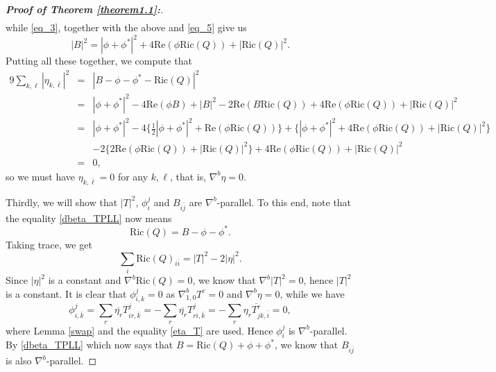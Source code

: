 \documentclass{amsart}
\numberwithin{equation}{section}
\theoremstyle{definition}
\renewcommand{\1}{\mathds{1}}
\renewcommand{\>}{\rightarrow}
\begin{document}
\begin{proof}[{\bf Proof of Theorem \ref{theorem1.1}:}]
\begin{eqnarray*}
\end{eqnarray*}
while \eqref{eq_3}, together with the above and \eqref{eq_5} give us
\[|B|^2 = |\phi + \phi^*|^2 + 4\mathrm{Re}(\phi \mathrm{Ric}(Q)) + |\mathrm{Ric}(Q)|^2.\]
Putting all these together, we compute that
\begin{eqnarray*}
9\sum_{k,\ell}|\eta_{k,\bar{\ell}}|^2   & = & |B-\phi -\phi^{\ast} - \mathrm{Ric}(Q)|^2 \\
& = & |\phi +\phi^{\ast}|^2 -4 \mathrm{Re}(\phi B) + |B|^2 -2 \mathrm{Re}(B\mathrm{Ric}(Q))  +4\mathrm{Re}(\phi \mathrm{Ric}(Q))  + |\mathrm{Ric}(Q)|^2\\
& = & |\phi +\phi^{\ast}|^2 -4 \{ \frac{1}{2}|\phi+\phi^*|^2 +  \mathrm{Re}(\phi  \mathrm{Ric}(Q)) \} + \{ |\phi + \phi^*|^2 + 4\mathrm{Re}(\phi \mathrm{Ric}(Q)) + |\mathrm{Ric}(Q)|^2\} \\
& & - 2\{ 2 \mathrm{Re}(\phi \mathrm{Ric}(Q))  + |\mathrm{Ric}(Q)|^2 \}  + 4\mathrm{Re}(\phi \mathrm{Ric}(Q))  + |\mathrm{Ric}(Q)|^2\\
& = & 0,
\end{eqnarray*}
so we must have $\eta_{k,\bar{\ell}} =0$ for any $k,\ell$, that is,  $\nabla^b\eta=0$.

Thirdly, we will show that $|T|^2$, $\phi_i^j$ and $B_{i \bar{j}}$ are $\nabla^b$-parallel. To this end, note that the equality \eqref{dbeta_TPLL} now means $$ \mathrm{Ric}(Q) = B - \phi - \phi^{\ast}. $$
Taking trace, we get
\[  \sum_i \mathrm{Ric}(Q)_{i\bar{i}}  = |T|^2-2|\eta|^2.\]
Since $|\eta|^2$ is a constant and $\nabla^b \mathrm{Ric}(Q)=0$, we know that $\nabla^b |T|^2 =0$, hence $|T|^2$ is a constant. It is clear that $\phi_{i,k}^j=0$ as $\nabla^b_{1,0}T^c=0$ and $\nabla^b \eta=0$, while we have
\[ \phi_{i,\bar{k}}^j = \sum_r \overline{\eta_r} T^j_{ir,\bar{k}} =- \sum_r \overline{\eta_r} T^j_{ri,\bar{k}}
= -\sum_r \overline{\eta_r T^r_{jk,\bar{i}}}=0,\]
where Lemma \ref{swap} and the equality \eqref{eta_T} are used. Hence $\phi_i^j$ is $\nabla^b$-parallel. By \eqref{dbeta_TPLL} which now says that $B=\mathrm{Ric}(Q) +\phi + \phi^{\ast} $, we know that $B_{i \bar{j}}$ is also $\nabla^b$-parallel.


\end{proof}
\end{document}
